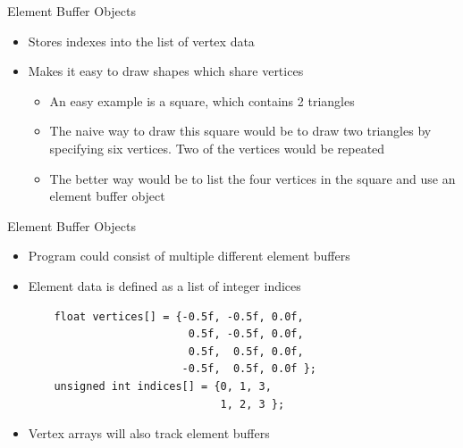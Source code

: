 \documentclass{beamer}
\begin{document}
\begin{frame}[fragile]{Element Buffer Objects}
    \begin{itemize}
        \item Stores indexes into the list of vertex data
        \item Makes it easy to draw shapes which share vertices
              \begin{itemize}
                  \item An easy example is a square, which contains 2 triangles
                  \item The naive way to draw this square would be to draw two triangles by specifying six vertices. Two of
                        the vertices would be repeated
                  \item The better way would be to list the four vertices in the square and use an element buffer object
              \end{itemize}
    \end{itemize}
\end{frame}

\begin{frame}[fragile]{Element Buffer Objects}
    \begin{itemize}
        \item Program could consist of multiple different element buffers
        \item Element data is defined as a list of integer indices
              \begin{verbatim}
    float vertices[] = {-0.5f, -0.5f, 0.0f,
                         0.5f, -0.5f, 0.0f,
                         0.5f,  0.5f, 0.0f,
                        -0.5f,  0.5f, 0.0f };
    unsigned int indices[] = {0, 1, 3,
                              1, 2, 3 };
 \end{verbatim}
        \item Vertex arrays will also track element buffers
    \end{itemize}
\end{frame}
\end{document}
